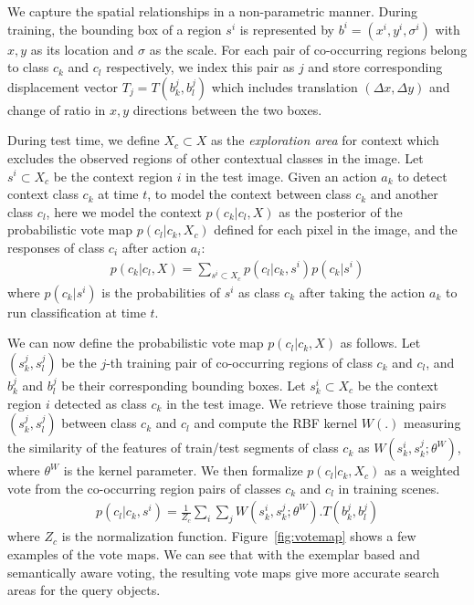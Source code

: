We capture the spatial relationships in a non-parametric manner. During training, the bounding box of a region $s^i$ is represented by $b^i = (x^i, y^i, \sigma^i)$ with $x, y$ as its location and $\sigma$ as the scale. For each pair of co-occurring regions belong to class $c_k$ and $c_l$ respectively, we index this pair as $j$ and store corresponding displacement vector $T_j= T(b^j_k, b^j_l)$ which includes translation $(\Delta x,\Delta y)$ and change of ratio in $x, y$ directions between the two boxes. 

During test time,  we define $X_c \subset X$ as the \textit{exploration area} for context which excludes the observed regions of other contextual classes in the image. Let $s^i \subset X_c$ be the context region $i$ in the test image. Given an action $a_k$ to detect context class $c_k$ at time $t$, to model the context between class $c_k$ and another class $c_l$, here we model the context $p(c_k|c_l,X)$ as the posterior of the probabilistic vote map $p(c_l|c_k,X_c)$ defined for each pixel in the image, and the responses of class $c_i$ after action $a_i$:
\begin{eqnarray}
p(c_k|c_l,X) = \sum_{s^i \subset X_c} p(c_l|c_k,s^i)p(c_k|s^i)
\end{eqnarray}
where $p(c_k|s^i)$ is the probabilities of $s^i$ as class $c_k$ after taking the action $a_k$ to run classification at time $t$.

 We can now define the probabilistic vote map $p(c_l|c_k,X)$ as follows.  Let $(s_k^j, s_l^j)$ be the $j$-th training pair of co-occurring regions of class $c_k$ and $c_l$, and $b_{k}^j$ and $b_l^j$ be their corresponding bounding boxes. Let $s_k^i \subset X_c$ be the context region $i$ detected as class $c_k$ in the test image. We retrieve those training pairs $(s_k^j, s_l^j)$ between class $c_k$ and $c_l$ and compute the RBF kernel $W(.)$ measuring the similarity of the features of train/test segments of class $c_k$ as $W(s_k^i,s_k^j;\theta^W)$, where $\theta^W$ is the kernel parameter. We then formalize $p(c_l|c_k,X_c)$ as a weighted vote from the co-occurring region pairs of classes $c_k$ and $c_l$ in training scenes.
\begin{eqnarray}
\label{eq:votemap}
p(c_l|c_k,s^i) = \frac{1}{Z_c}\sum_{i} \sum_{j} W(s_k^i,s_k^j;\theta^W).T(b_k^j,b_l^j)
\end{eqnarray}
where $Z_c$ is the normalization function. Figure~\ref{fig:votemap} shows a few examples of the vote maps. We can see that with the exemplar based and semantically aware voting, the resulting vote maps give more accurate search areas for the query objects.


